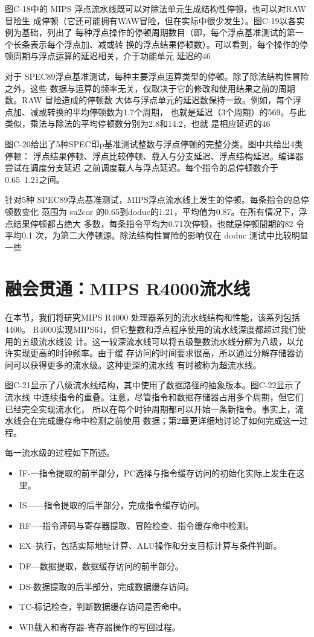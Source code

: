 图C-18中的 MIPS 浮点流水线既可以对除法单元生成结构性停顿，也可以对RAW 冒险生
成停顿（它还可能拥有WAW冒险，但在实际中很少发生）。图C-19以各实例为基础，列出了
每种浮点操作的停顿周期数目（即，每个浮点基准测试的第一个长条表示每个浮点加、减或转
换的浮点结果停顿数）。可以看到，每个操作的停顿周期与浮点运算的延迟相关，介于功能单元
延迟的46%

对于 SPEC89浮点基准测试，每种主要浮点运算类型的停顿。除了除法结构性冒险之外，这些
数据与运算的频率无关，仅取决于它的修改和使用结果之前的周期数。RAW 冒险造成的停顿数
大体与浮点单元的延迟数保持一致。例如，每个浮点加、减或转换的平均停顿数为1.7个周期，
也就是延迟（3个周期）的569。与此类似，乘法与除法的平均停顿数分别为2.8和14.2，也就
是相应延迟的46%


图C-20给出了5种SPEC印p基准测试整数与浮点停顿的完整分类。图中共给出4类停顿：
浮点结果停顿、浮点比较停顿、载入与分支延迟、浮点结构延迟。编译器尝试在调度分支延迟
之前调度载人与浮点延迟。每个指令的总停顿数介于0.65~1.21之间。

针对5种 SPEC89浮点基准测试，MIPS浮点流水线上发生的停顿。每条指令的总停顿数变化
范围为 su2cor 的0.65到doduc的1.21，平均值为0.87。在所有情况下，浮点结果停顿都占绝大
多数，每条指令平均为0.71次停顿，也就是停顿間期的82%
令平均0.1 次，为第二大停顿源。除法结构性冒险的影响仅在 doduc 测试中比较明显一些

\section{融会贯通：MIPS R4000流水线}
在本节，我们将研究MIPS R4000 处理器系列的流水线结构和性能，该系列包括4400。
R4000实现MIPS64，但它整数和浮点程序使用的流水线深度都超过我们使用的五级流水线设
计。这一较深流水线可以将五级整数流水线分解为八级，以允许实现更高的时钟频率。由于缓
存访问的时间要求很高，所以通过分解存储器访问可以获得更多的流水级。这种更深的流水线
有时被称为超流水线。

图C-21显示了八级流水线结构，其中使用了数据路径的抽象版本。图C-22显示了流水线
中连续指令的重叠。注意，尽管指令和数据存储器占用多个周期，但它们已经完全实现流水化，
所以在每个时钟周期都可以开始一条新指令。事实上，流水线会在完成缓存命中检测之前使用
数据；第2章更详细地讨论了如何完成这一过程。

每一流水级的过程如下所述。
\begin{itemize}
    \item IF-一指令提取的前半部分，PC选择与指令缓存访问的初始化实际上发生在这里。
    \item IS——指令提取的后半部分，完成指令缓存访问。
    \item RF—-指令译码与寄存器提取、冒险检查、指令缓存命中检测。
    \item EX--执行，包括实际地址计算、ALU操作和分支目标计算与条件判断。
    \item DF—数据提取，数据缓存访问的前半部分。
    \item DS-数据提取的后半部分，完成数据缓存访问。
    \item TC-标记检查，判断数据缓存访问是否命中。
    \item WB载入和寄存器-寄存器操作的写回过程。
\end{itemize}


